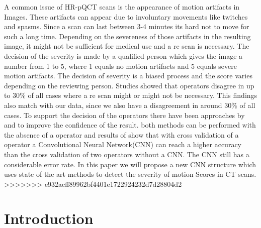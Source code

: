 \documentclass[
a4paper, 
12pt,
grayscalebody, %
abstract=on,
twoside, BCOR10mm, 12pt, DIV13,headinclude, footexclude, final, abstracton, openright
]{ibireprt}
\numberwithin{equation}{chapter}
\numberwithin{table}{chapter}
\numberwithin{figure}{chapter}
\numberwithin{algorithm}{chapter}
\numberwithin{example}{chapter}
\numberwithin{example}{chapter}
\begin{document}
	
	A common issue of HR-pQCT scans is the appearance of motion artifacts in Images. These artifacts can appear due to involuntary movements like twitches and spasms. Since a scan can last between 3-4 minutes its hard not to move for such a long time. Depending on the severeness of those artifacts in the resulting image, it might not be sufficient for medical use and a re scan is necessary. The decision of the severity is made by a qualified person which gives the image a number from 1 to 5, where 1 equals no motion artifacts and 5 equals severe motion artifacts. The decision of severity is a  biased process and the score varies depending on the reviewing person. Studies showed that operators disagree in up to 30\% %
	of all cases where a re scan might or might not be necessary. This findings also match with our data, since we also have a disagreement in around 30\% of all cases. To support the decision of the operators there have been approaches by \cite{Sode2011} and \cite{Walle2023}  to improve the confidence of the result. both methods can be performed with the absence of a operator and results of \cite{Sode2011} show that with cross validation of a operator  a Convolutional Neural Network(CNN) can reach a higher accuracy than the cross validation of two operators without a CNN. The CNN still has a considerable error rate. In this paper we will propose a new CNN structure which uses state of the art methods to detect the severity of motion Scores in CT scans. %
>>>>>>> e932acff89962bf4401e1722924232d7d28804d2

\chapter{Introduction}
\end{document}

